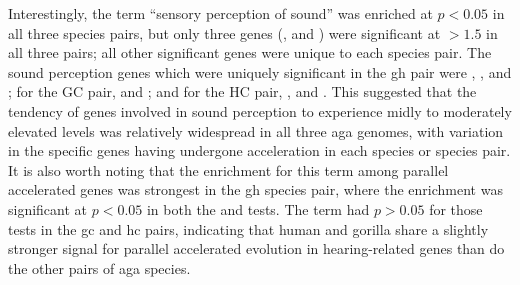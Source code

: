 Interestingly, the term ``sensory perception of sound'' was enriched
at $p<0.05$ in all three species pairs, but only three genes
(,  and ) were significant at
\lrtmin$>1.5$ in all three pairs; all other significant genes were
unique to each species pair. The sound perception genes which were
uniquely significant in the \ac{gh} pair were ,
,  and ; for the GC pair,
 and ; and for the HC pair, ,
 and . This suggested that the tendency of
genes involved in sound perception to experience midly to moderately
elevated \dnds levels was relatively widespread in all three \ac{aga}
genomes, with variation in the specific genes having undergone
acceleration in each species or species pair. It is also worth noting
that the enrichment for this term among parallel accelerated genes was
strongest in the \ac{gh} species pair, where the enrichment was
significant at $p<0.05$ in both the \topgo and \goseq tests. The term
had $p>0.05$ for those tests in the \ac{gc} and \ac{hc} pairs,
indicating that human and gorilla share a slightly stronger signal for
parallel accelerated evolution in hearing-related genes than do the
other pairs of \ac{aga} species.

